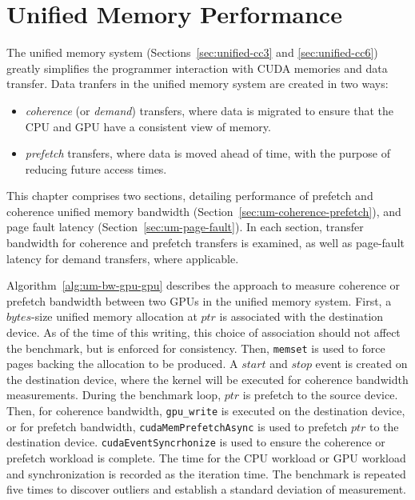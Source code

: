 \chapter{Unified Memory Performance}
\label{ch:unified}

The unified memory system (Sections~\ref{sec:unified-cc3} and \ref{sec:unified-cc6}) greatly simplifies the programmer interaction with CUDA memories and data transfer.
Data tranfers in the unified memory system are created in two ways:
\begin{itemize}
	\item \textit{coherence} (or \textit{demand}) transfers, where data is migrated to ensure that the CPU and GPU have a consistent view of memory.
	\item \textit{prefetch} transfers, where data is moved ahead of time, with the purpose of reducing future access times. 
\end{itemize}
This chapter comprises two sections, detailing performance of prefetch and coherence unified memory bandwidth (Section~\ref{sec:um-coherence-prefetch}), and page fault latency (Section~\ref{sec:um-page-fault}).
In each section, transfer bandwidth for coherence and prefetch transfers is examined, as well as page-fault latency for demand transfers, where applicable.

Algorithm~\ref{alg:um-bw-gpu-gpu} describes the approach to measure coherence or prefetch bandwidth between two GPUs in the unified memory system.
First, a $bytes$-size unified memory allocation at $ptr$ is associated with the destination device.
As of the time of this writing, this choice of association should not affect the benchmark, but is enforced for consistency.
Then, \texttt{memset} is used to force pages backing the allocation to be produced.
A $start$ and $stop$ event is created on the destination device, where the kernel will be executed for coherence bandwidth measurements.
During the benchmark loop, $ptr$ is prefetch to the source device.
Then, for coherence bandwidth, \texttt{gpu\_write} is executed on the destination device, or for prefetch bandwidth, \texttt{cudaMemPrefetchAsync} is used to prefetch $ptr$ to the destination device.
\texttt{cudaEventSyncrhonize} is used to ensure the coherence or prefetch workload is complete.
The time for the CPU workload or GPU workload and synchronization is recorded as the iteration time.
The benchmark is repeated five times to discover outliers and establish a standard deviation of measurement.

